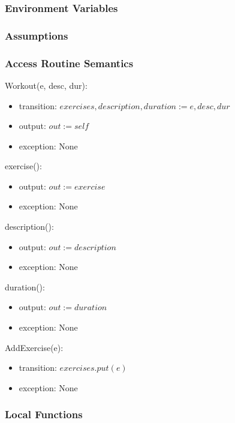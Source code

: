 \documentclass[12pt, titlepage]{article}
\begin{document}
\subsubsection{Environment Variables}

\subsubsection{Assumptions}

\subsubsection{Access Routine Semantics}

Workout(e, desc, dur):
\begin{itemize}
	\item transition: $exercises, description, duration := e, desc, dur$
	\item output: $out := self$
	\item exception: None
\end{itemize}

exercise():
\begin{itemize}
	\item output: $out := exercise$
	\item exception: None
\end{itemize}

description():
\begin{itemize}
	\item output: $out := description$
	\item exception: None
\end{itemize}

duration():
\begin{itemize}
	\item output: $out := duration$
	\item exception: None
\end{itemize}

AddExercise(e):
\begin{itemize}
	\item transition: $exercises.put(e)$
	\item exception: None
\end{itemize}

\subsubsection{Local Functions}

\newpage
\end{document}
